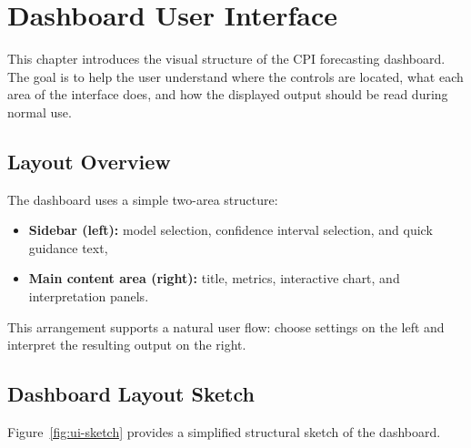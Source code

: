 %
%

\chapter{Dashboard User Interface}
\label{ch:dashboard-ui}

This chapter introduces the visual structure of the CPI forecasting dashboard. The goal is to help the user understand where the controls are located, what each area of the interface does, and how the displayed output should be read during normal use.

\section{Layout Overview}

The dashboard uses a simple two-area structure:

\begin{itemize}
    \item \textbf{Sidebar (left):} model selection, confidence interval selection, and quick guidance text,
    \item \textbf{Main content area (right):} title, metrics, interactive chart, and interpretation panels.
\end{itemize}

This arrangement supports a natural user flow: choose settings on the left and interpret the resulting output on the right.

\section{Dashboard Layout Sketch}

Figure~\ref{fig:ui-sketch} provides a simplified structural sketch of the dashboard.

